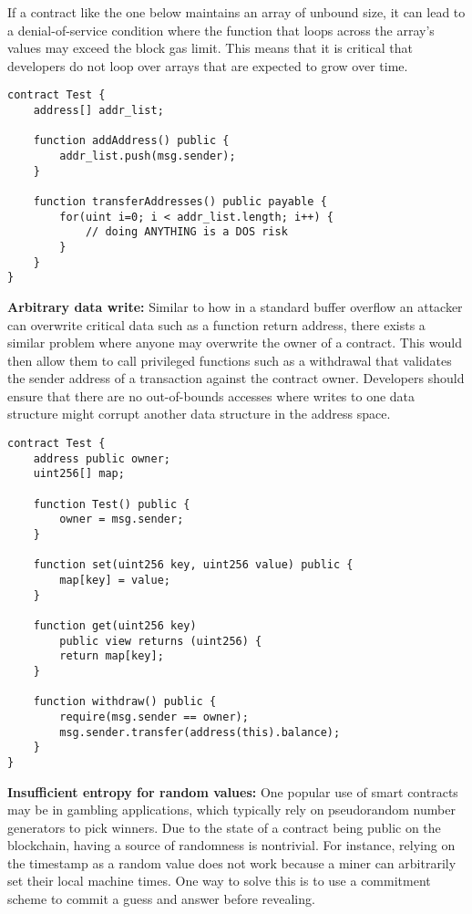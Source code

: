 If a contract like the one below maintains an array of unbound size, it can lead to a denial-of-service condition where the function that loops across the array's values may exceed the block gas limit.
This means that it is critical that developers do not loop over arrays that are expected to grow over time.
\begin{lstlisting}[basicstyle=\small]
contract Test {
    address[] addr_list;

    function addAddress() public {
        addr_list.push(msg.sender);
    }

    function transferAddresses() public payable {
        for(uint i=0; i < addr_list.length; i++) {
            // doing ANYTHING is a DOS risk
        }
    }
}
\end{lstlisting}
\textbf{Arbitrary data write:} Similar to how in a standard buffer overflow an attacker can overwrite critical data such as a function return address, there exists a similar problem where anyone may overwrite the owner of a contract.
This would then allow them to call privileged functions such as a withdrawal that validates the sender address of a transaction against the contract owner.
Developers should ensure that there are no out-of-bounds accesses where writes to one data structure might corrupt another data structure in the address space.
\begin{lstlisting}[basicstyle=\small]
contract Test {
    address public owner;
    uint256[] map;

    function Test() public {
        owner = msg.sender;
    }

    function set(uint256 key, uint256 value) public {
        map[key] = value;
    }

    function get(uint256 key) 
        public view returns (uint256) {
        return map[key];
    }

    function withdraw() public {
        require(msg.sender == owner);
        msg.sender.transfer(address(this).balance);
    }
}

\end{lstlisting}
\textbf{Insufficient entropy for random values:} One popular use of smart contracts may be in gambling applications, which typically rely on pseudorandom number generators to pick winners.
Due to the state of a contract being public on the blockchain, having a source of randomness is nontrivial.
For instance, relying on the timestamp as a random value does not work because a miner can arbitrarily set their local machine times.
One way to solve this is to use a commitment scheme to commit a guess and answer before revealing.

